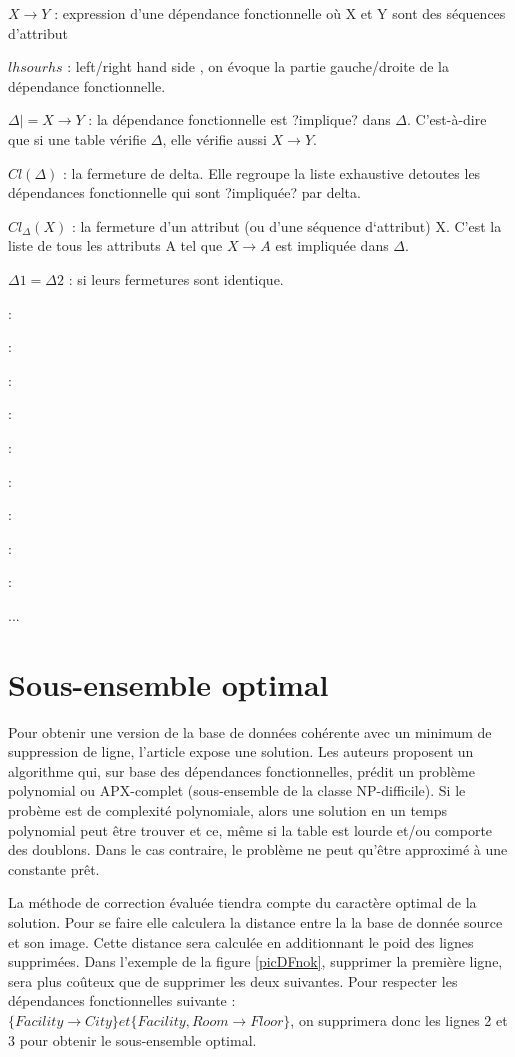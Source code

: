 \documentclass[12pt, a4paper, oneside, titlepage]{book}%
\begin{document}
\begin{description}
\item{$X \rightarrow Y$ : } expression d'une dépendance fonctionnelle où X et Y sont des séquences d'attribut
\item{$lhs ou rhs$ : } \fg left/right hand side \og, on évoque la partie gauche/droite de la dépendance fonctionnelle.
\item{$\Delta |= X \rightarrow Y$ : } la dépendance fonctionnelle est ?implique? dans $\Delta$. C'est-à-dire que si une table vérifie $\Delta$, elle vérifie aussi $X \rightarrow Y$.
\item{$Cl(\Delta)$ : } la fermeture de delta. Elle regroupe la liste exhaustive detoutes les dépendances fonctionnelle qui sont ?impliquée? par delta.
\item{$Cl_\Delta(X)$ : }  la fermeture d’un attribut (ou d’une séquence d‘attribut) X. C’est la liste de tous les attributs A tel que $X \rightarrow A$ est impliquée dans $\Delta$.
\item{$\Delta1 = \Delta2$ : } si leurs fermetures sont identique.



\item{ : } 
\item{ : } 
\item{ : } 
\item{ : } 
\item{ : } 
\item{ : } 
\item{ : } 
\item{ : } 
\item{ : } 
\end{description}
...
\clearpage
\chapter{Sous-ensemble optimal}\label{CHsrepair}
Pour obtenir une version de la base de données cohérente avec un minimum de suppression de ligne, l'article \cite{article} expose une solution. Les auteurs proposent un algorithme qui, sur base des dépendances fonctionnelles, prédit un problème polynomial ou APX-complet (sous-ensemble de la classe NP-difficile). Si le probème est de complexité polynomiale, alors une solution en un temps polynomial peut être trouver et ce, même si la table est lourde et/ou comporte des doublons. Dans le cas contraire, le problème ne peut qu'être approximé à une constante prêt.

La méthode de correction évaluée tiendra compte du caractère optimal de la solution. Pour se faire elle calculera la distance entre la la base de donnée source et son image. Cette distance sera calculée en additionnant le poid des lignes supprimées.
Dans l'exemple de la figure \ref{picDFnok}, supprimer la première ligne, sera plus coûteux que de supprimer les deux suivantes. Pour respecter les dépendances fonctionnelles suivante : $\{ Facility \rightarrow City \} et \{ Facility, Room \rightarrow Floor \}$, on supprimera donc les lignes 2 et 3 pour obtenir le sous-ensemble optimal.
\end{document}
